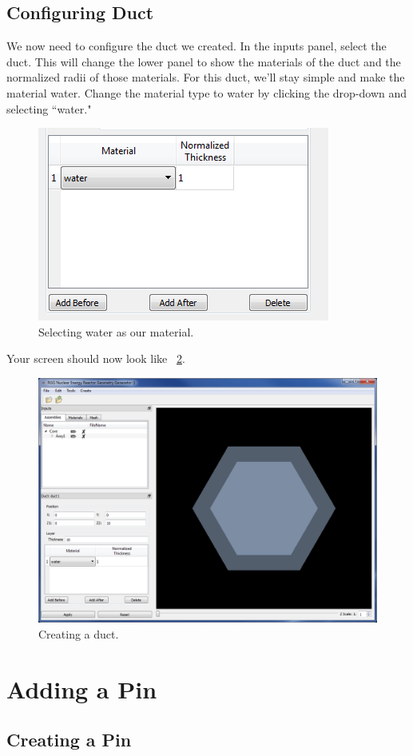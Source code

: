 \subsection{Configuring Duct}

We now need to configure the duct we created.  In the inputs panel, select the duct.  This will change the lower panel to show the materials of the duct and the normalized radii of those materials.  For this duct, we'll stay simple and make the material water.  Change the material type to water by clicking the drop-down and selecting ``water."

\begin{figure}[H]
	\begin{center}
		\includegraphics[width=0.5\linewidth]{Images/hex-7.png}
		\caption{Selecting water as our material.}
		\label{fig:Hex7}
	\end{center}
\end{figure}

Your screen should now look like ~\ref{fig:Hex8}.

\begin{figure}[H]
	\begin{center}
		\includegraphics[width=0.5\linewidth]{Images/hex-8.png}
		\caption{Creating a duct.}
		\label{fig:Hex8}
	\end{center}
\end{figure}

\section{Adding a Pin}
\subsection{Creating a Pin}

